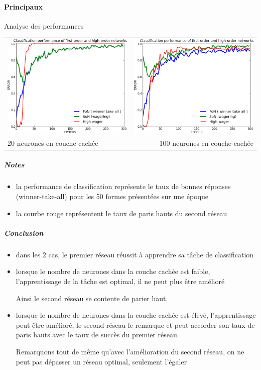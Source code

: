     \paragraph{Principaux}
      Analyse des performances
      \begin{center}
	\begin{tabular}{lr}
	  \hspace*{-1cm}
	  \includegraphics[width=250px]{data/expC2/perf_20.png}
	  &
	  \includegraphics[width=250px]{data/expC2/perf_100.png} \\
	  
	  20 neurones en couche cachée
	  &
	  \hspace*{-1cm}
	  100 neurones en couche cachée
	\end{tabular}
      \end{center}
      \subparagraph{Notes}
	\begin{itemize}
	  \item la performance de classification représente le taux de bonnes réponses (winner-take-all) pour les 50 formes présentées sur une époque
	  \item la courbe rouge représentent le taux de paris hauts du second réseau
	\end{itemize}
      \subparagraph{Conclusion}
	\begin{itemize}
	  \item dans les 2 cas, le premier réseau réussit à apprendre sa tâche de classification
	  \item lorsque le nombre de neurones dans la couche cachée est faible, l'apprentissage de la tâche est optimal, il ne peut plus être amélioré
	  
	  Ainsi le second réseau se contente de parier haut.
	  \item lorsque le nombre de neurones dans la couche cachée est élevé, l'apprentissage peut être amélioré, le second réseau 
	  le remarque et peut accorder son taux de paris hauts avec le taux de succès du premier réseau.
	  
	  Remarquons tout de même qu'avec l'amélioration du second réseau, on ne peut pas dépasser un réseau optimal, seulement l'égaler
	\end{itemize}

